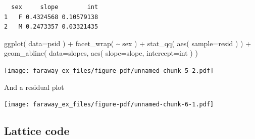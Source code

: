 \documentclass[
  letterpaper,
  DIV=11,
  numbers=noendperiod]{scrreprt}
\newenvironment{Shaded}{}{}
\newcommand{\AttributeTok}[1]{\textcolor[rgb]{0.49,0.56,0.16}{#1}}
\newcommand{\DecValTok}[1]{\textcolor[rgb]{0.25,0.63,0.44}{#1}}
\newcommand{\FloatTok}[1]{\textcolor[rgb]{0.25,0.63,0.44}{#1}}
\newcommand{\FunctionTok}[1]{\textcolor[rgb]{0.02,0.16,0.49}{#1}}
\newcommand{\NormalTok}[1]{#1}
\newcommand{\OtherTok}[1]{\textcolor[rgb]{0.00,0.44,0.13}{#1}}
\newcommand{\SpecialCharTok}[1]{\textcolor[rgb]{0.25,0.44,0.63}{#1}}
\newcommand{\StringTok}[1]{\textcolor[rgb]{0.25,0.44,0.63}{#1}}
\begin{document}
\begin{verbatim}
  sex     slope        int
1   F 0.4324568 0.10579138
2   M 0.2473357 0.03321435
\end{verbatim}

\begin{Shaded}
\begin{Highlighting}[]
\FunctionTok{ggplot}\NormalTok{( }\AttributeTok{data=}\NormalTok{psid ) }\SpecialCharTok{+}
    \FunctionTok{facet\_wrap}\NormalTok{( }\SpecialCharTok{\textasciitilde{}}\NormalTok{ sex ) }\SpecialCharTok{+}
    \FunctionTok{stat\_qq}\NormalTok{( }\FunctionTok{aes}\NormalTok{( }\AttributeTok{sample=}\NormalTok{resid ) ) }\SpecialCharTok{+}
    \FunctionTok{geom\_abline}\NormalTok{( }\AttributeTok{data=}\NormalTok{slopes, }\FunctionTok{aes}\NormalTok{( }\AttributeTok{slope=}\NormalTok{slope, }\AttributeTok{intercept=}\NormalTok{int ) )}
\end{Highlighting}
\end{Shaded}

\texttt{[image: faraway\_ex\_files/figure-pdf/unnamed-chunk-5-2.pdf]}

And a residual plot

\begin{Shaded}
\end{Shaded}

\texttt{[image: faraway\_ex\_files/figure-pdf/unnamed-chunk-6-1.pdf]}

\subsection{Lattice code}\label{lattice-code}
\end{document}
